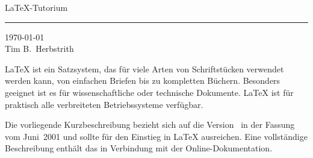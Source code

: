 
\begin{titlepage}
\renewcommand{\thefootnote}{\fnsymbol{footnote}}
{\Huge%
\selectfont
\raggedright
\LaTeX-Tutorium
\rule{\textwidth}{0.75pt}
\par
}
\begin{flushleft}
  \normalsize
  \selectfont
  \today\\[2ex]
  Tim B.~Herbstrith
\end{flushleft}

\vfill

{\parindent=0cm
\LaTeX{} ist ein Satzsystem, das für viele Arten von
Schriftstücken verwendet werden kann, von einfachen Briefen bis zu
kompletten Büchern.  Besonders geeignet ist es für
wissenschaftliche oder technische Dokumente. \LaTeX{} ist für
praktisch alle verbreiteten Betriebssysteme verfügbar.

Die vorliegende Kurzbeschreibung bezieht sich auf die Version
\LaTeXe\ in der Fassung vom Juni~2001 und sollte für den
Einstieg in \LaTeX{} ausreichen.
Eine vollständige Beschreibung enthält das \manual{}
in Verbindung mit der Online-Dokumentation.
}
\setcounter{footnote}{0}
\end{titlepage}


